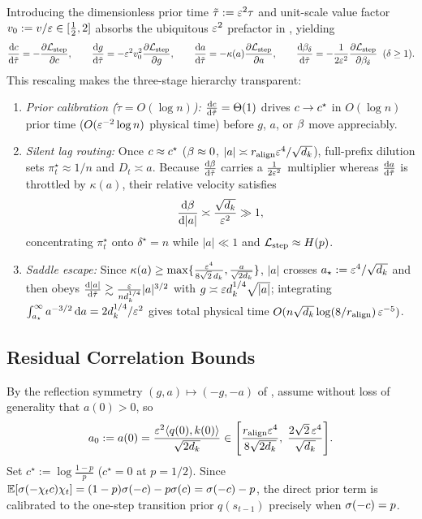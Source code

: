 Introducing the dimensionless prior time $\tilde\tau := \varepsilon^2\tau$ and unit-scale value factor $v_0 := v/\varepsilon \in [\frac{1}{2}, 2]$ absorbs the ubiquitous $\varepsilon^2$ prefactor in \stepode{}, yielding
\[
  \frac{\rmd\cnt}{\rmd\tilde\tau} = -\pd{\Lstep}{\cnt}, \qquad
  \frac{\rmd g}{\rmd\tilde\tau} = -\initscale^2 v_0^2\pd{\Lstep}{g}, \qquad
  \frac{\rmd a}{\rmd\tilde\tau} = -\kappa(a)\pd{\Lstep}{a}, \qquad
  \frac{\rmd\brel_\delta}{\rmd\tilde\tau} = -\frac{1}{2\initscale^2}\pd{\Lstep}{\brel_\delta} \;\; (\delta \ge 1).
\]
This rescaling makes the three-stage hierarchy transparent:
\begin{enumerate}[leftmargin=*,itemsep=2pt,topsep=3pt]
\item \emph{Prior calibration ($\tilde\tau = O(\log n)$):} $\frac{\mathrm{d}c}{\mathrm{d}\tilde\tau} = \Theta(1)$ drives $c \to c^\star$ in $O(\log n)$ prior time ($O(\varepsilon^{-2}\log n)$ physical time) before $g$, $a$, or $\beta$ move appreciably.
\item \emph{Silent lag routing:} Once $c \approx c^\star$ ($\beta \approx 0$, $|a| \asymp r_{\mathrm{align}}\varepsilon^4/\sqrt{d_k}$), full-prefix dilution sets $\pi_t^\star \approx 1/n$ and $D_t \asymp a$. Because $\frac{\mathrm{d}\beta}{\mathrm{d}\tilde\tau}$ carries a $\frac{1}{2\varepsilon^2}$ multiplier whereas $\frac{\mathrm{d} a}{\mathrm{d}\tilde\tau}$ is throttled by $\kappa(a)$, their relative velocity satisfies
\[
  \frac{\mathrm{d}\beta}{\mathrm{d}|a|} \asymp \frac{\sqrt{d_k}}{\varepsilon^2} \gg 1,
\]
concentrating $\pi_t^\star$ onto $\delta^\star = n$ while $|a| \ll 1$ and $\mathcal L_{\mathrm{step}} \approx H(p)$.
\item \emph{Saddle escape:} Since $\kappa(a) \ge \max\{\frac{\varepsilon^4}{8\sqrt 2\,d_k}, \frac{a}{\sqrt{2d_k}}\}$, $|a|$ crosses $a_\star := \varepsilon^4/\sqrt{d_k}$ and then obeys $\frac{\mathrm{d}|a|}{\mathrm{d}\tilde\tau} \gtrsim \frac{\varepsilon}{n d_k^{1/4}}|a|^{3/2}$ with $g \asymp \varepsilon d_k^{1/4}\sqrt{|a|}$; integrating $\int_{a_\star}^\infty a^{-3/2}\,\mathrm{d} a = 2d_k^{1/4}/\varepsilon^2$ gives total physical time $O(n\sqrt{d_k}\log(8/r_{\mathrm{align}})\,\varepsilon^{-5})$.
\end{enumerate}

\subsection{Residual Correlation Bounds}
\label{app:J-cancel-sub}

By the reflection symmetry $(g, a) \mapsto (-g, -a)$ of \stepode{}, assume without loss of generality that $a(0) > 0$, so
\begin{equation}
 a_0 := a(0) = \frac{\varepsilon^2\langle q(0), k(0)\rangle}{\sqrt{2d_k}} \in \Biggl[\frac{r_{\mathrm{align}}\varepsilon^4}{8\sqrt{2d_k}},\; \frac{2\sqrt 2\,\varepsilon^4}{\sqrt{d_k}}\Biggr].
 \label{eq:U-a0}
\end{equation}
Set $c^\star := \log\frac{1-p}{p}$ ($c^\star = 0$ at $p = 1/2$). Since $\mathbb E[\sigma(-\chi_tc)\chi_t] = (1-p)\sigma(-c) - p\sigma(c) = \sigma(-c) - p$, the direct prior term is calibrated to the one-step transition prior $q(s_{t-1})$ precisely when $\sigma(-c) = p$.

